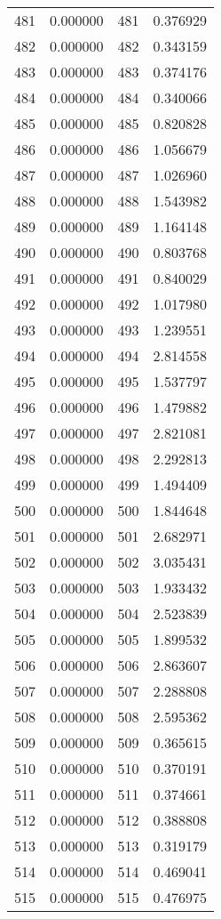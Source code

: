 \documentclass[12pt]{article}
\begin{document}
\begin{longtable}{@{}cccc@{}}
481 & 0.000000 & 481 & 0.376929 \\
482 & 0.000000 & 482 & 0.343159 \\
483 & 0.000000 & 483 & 0.374176 \\
484 & 0.000000 & 484 & 0.340066 \\
485 & 0.000000 & 485 & 0.820828 \\
486 & 0.000000 & 486 & 1.056679 \\
487 & 0.000000 & 487 & 1.026960 \\
488 & 0.000000 & 488 & 1.543982 \\
489 & 0.000000 & 489 & 1.164148 \\
490 & 0.000000 & 490 & 0.803768 \\
491 & 0.000000 & 491 & 0.840029 \\
492 & 0.000000 & 492 & 1.017980 \\
493 & 0.000000 & 493 & 1.239551 \\
494 & 0.000000 & 494 & 2.814558 \\
495 & 0.000000 & 495 & 1.537797 \\
496 & 0.000000 & 496 & 1.479882 \\
497 & 0.000000 & 497 & 2.821081 \\
498 & 0.000000 & 498 & 2.292813 \\
499 & 0.000000 & 499 & 1.494409 \\
500 & 0.000000 & 500 & 1.844648 \\
501 & 0.000000 & 501 & 2.682971 \\
502 & 0.000000 & 502 & 3.035431 \\
503 & 0.000000 & 503 & 1.933432 \\
504 & 0.000000 & 504 & 2.523839 \\
505 & 0.000000 & 505 & 1.899532 \\
506 & 0.000000 & 506 & 2.863607 \\
507 & 0.000000 & 507 & 2.288808 \\
508 & 0.000000 & 508 & 2.595362 \\
509 & 0.000000 & 509 & 0.365615 \\
510 & 0.000000 & 510 & 0.370191 \\
511 & 0.000000 & 511 & 0.374661 \\
512 & 0.000000 & 512 & 0.388808 \\
513 & 0.000000 & 513 & 0.319179 \\
514 & 0.000000 & 514 & 0.469041 \\
515 & 0.000000 & 515 & 0.476975 \\

\end{longtable}
\end{document}
